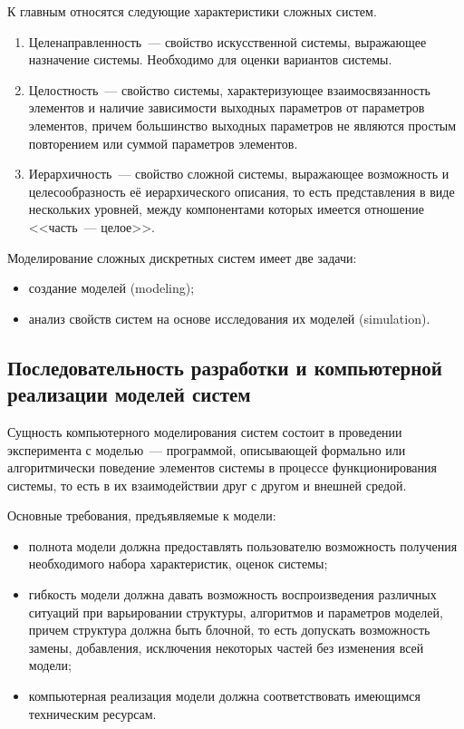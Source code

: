 К главным относятся следующие характеристики сложных систем.

\begin{enumerate}
    \item Целенаправленность~--- свойство искусственной системы, выражающее назначение системы. Необходимо для оценки вариантов системы.
    \item Целостность~--- свойство системы, характеризующее взаимосвязанность элементов и наличие зависимости выходных параметров от параметров элементов, причем большинство выходных параметров не являются простым повторением или суммой параметров элементов.
    \item Иерархичность~--- свойство сложной системы, выражающее возможность и целесообразность её иерархического описания, то есть представления в виде нескольких уровней, между компонентами которых имеется отношение <<часть~--- целое>>.
\end{enumerate}

Моделирование сложных дискретных систем имеет две задачи:

\begin{itemize}
    \item создание моделей (modeling);
    \item анализ свойств систем на основе исследования их моделей (simulation).
\end{itemize}

\subsection{Последовательность разработки и компьютерной реализации моделей систем}

Сущность компьютерного моделирования систем состоит в проведении эксперимента с моделью~--- программой, описывающей формально или алгоритмически поведение элементов системы в процессе функционирования системы, то есть в их взаимодействии друг с другом и внешней средой.

Основные требования, предъявляемые к модели:

\begin{itemize}
    \item полнота модели должна предоставлять пользователю возможность получения необходимого набора характеристик, оценок системы;
    \item гибкость модели должна давать возможность воспроизведения различных ситуаций при варьировании структуры, алгоритмов и параметров моделей, причем структура должна быть блочной, то есть допускать возможность замены, добавления, исключения некоторых частей без изменения всей модели;
    \item компьютерная реализация модели должна соответствовать имеющимся техническим ресурсам.
\end{itemize}

